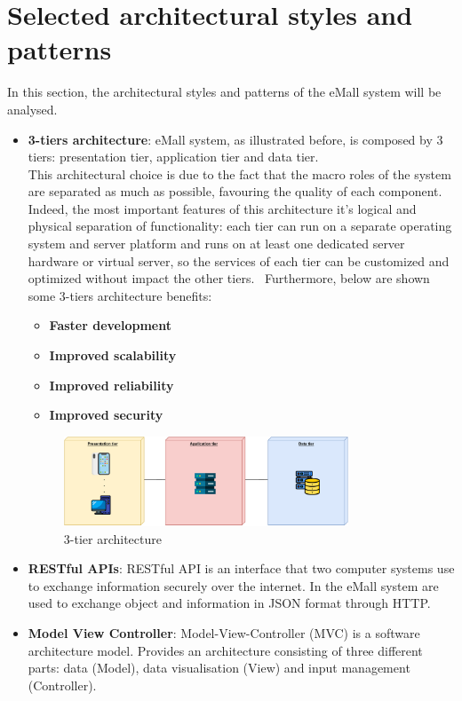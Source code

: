 \section{Selected architectural styles and patterns}
In this section, the architectural styles and patterns of the eMall system will be analysed.
\begin{itemize}
    \item \textbf{3-tiers architecture}: eMall system, as illustrated before, is composed by 3 tiers: presentation tier, application tier and data tier.\\
    This architectural choice is due to the fact that the macro roles of the system are separated as much as possible, favouring the quality of each component. Indeed, the most important features of this architecture it's logical and physical separation of functionality: each tier can run on a separate operating system and server platform and runs on at least one dedicated server hardware or virtual server, so the services of each tier can be customized and optimized without impact the other tiers. 
    Furthermore, below are shown some 3-tiers architecture benefits:
\begin{itemize}
    \item \textbf{Faster development}
    \item \textbf{Improved scalability}
    \item \textbf{Improved reliability}
    \item \textbf{Improved security}
\end{itemize}
\begin{figure}[H]
    \centering
    \includegraphics[width=0.8\textwidth]{images/3tier_shape.pdf}
    \caption{3-tier architecture}
    \label{fig:3-tier}
\end{figure}
\item \textbf{RESTful APIs}: RESTful API is an interface that two computer systems use to exchange information securely over the internet. In the eMall system are used to exchange object and information in JSON format through HTTP. 
\item \textbf{Model View Controller}: Model-View-Controller (MVC) is a software architecture model. Provides an architecture consisting of three different parts: data (Model), data visualisation (View) and input management (Controller).\\

\end{itemize}
